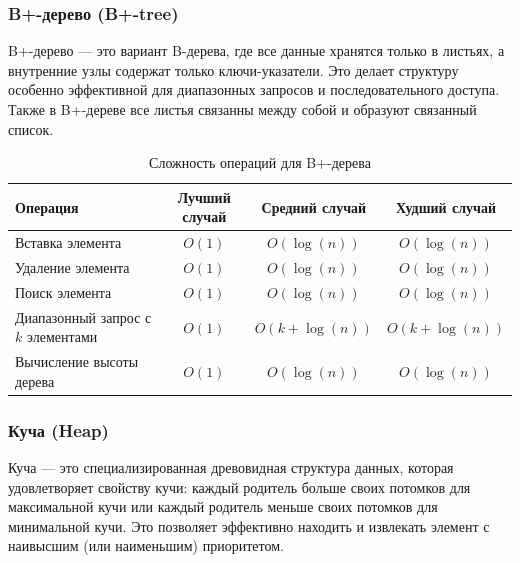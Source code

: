 \documentclass[a4paper,12pt]{article}
\begin{document}
\subsubsection{B+-дерево (B+-tree)}
\label{subsubsec:b-дерево-b-tree-1}

B+-дерево --- это вариант B-дерева, где все данные хранятся только в листьях, а внутренние узлы содержат только ключи-указатели. Это делает структуру особенно эффективной для диапазонных запросов и последовательного доступа. Также в B+-дереве все листья связанны между собой и образуют связанный список.

\begin{table}[H]
    \centering
    \begin{tabular}{|l|c|c|c|}
        \hline
        Операция & Лучший случай & Средний случай & Худший случай \\
        \hline
        Вставка элемента & $O(1)$ & $O(\log(n))$ & $O(\log(n))$ \\
        \hline
        Удаление элемента & $O(1)$ & $O(\log(n))$ & $O(\log(n))$ \\
        \hline
        Поиск элемента & $O(1)$ & $O(\log(n))$ & $O(\log(n))$ \\
        \hline
        \makecell[l]{Диапазонный запрос \\с $k$ элементами} & $O(1)$ & $O(k + \log(n))$ & $O(k + \log(n))$ \\
        \hline
        \makecell[l]{Вычисление высоты \\дерева} & $O(1)$ & $O(\log(n))$ & $O(\log(n))$ \\
        \hline
    \end{tabular}
    \caption{Сложность операций для B+-дерева}
\end{table}

\subsubsection{Куча (Heap)}
\label{subsubsec:куча-heap}

Куча --- это специализированная древовидная структура данных, которая удовлетворяет свойству кучи: каждый родитель больше своих потомков для максимальной кучи или каждый родитель меньше своих потомков для минимальной кучи. Это позволяет эффективно находить и извлекать элемент с наивысшим (или наименьшим) приоритетом.
\end{document}
